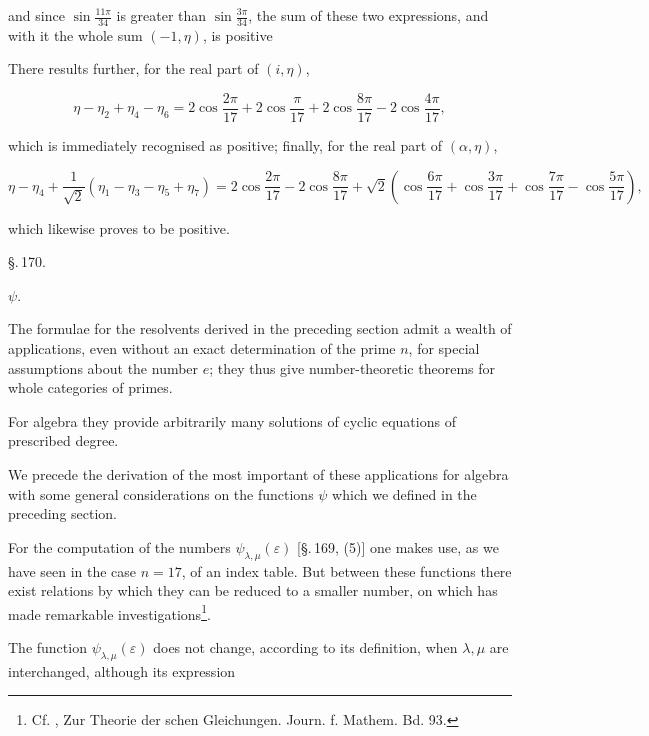 and since $\sin\frac{11\pi}{34}$ is greater than $\sin\frac{3\pi}{34}$, the sum of these
two expressions, and with it the whole sum $(-1,\eta)$, is positive %

There results further, for the real part of $(i,\eta)$,

\[
\eta - \eta_2 + \eta_4 - \eta_6 = 2\cos\frac{2\pi}{17} + 2\cos\frac{\pi}{17} + 2\cos\frac{8\pi}{17} - 2\cos\frac{4\pi}{17},
\]

which is immediately recognised as positive; finally, for the real
part of $(\alpha,\eta)$,

\[
\eta - \eta_4 + \frac{1}{\sqrt{2}}(\eta_1 - \eta_3 - \eta_5 + \eta_7)
= 2\cos\frac{2\pi}{17} - 2\cos\frac{8\pi}{17} + \sqrt{2}\left(\cos\frac{6\pi}{17} + \cos\frac{3\pi}{17} + \cos\frac{7\pi}{17} - \cos\frac{5\pi}{17}\right),
\]

which likewise proves to be positive.

\begin{center}
\S.\,170.

 $\psi$.
\end{center}

The formulae for the resolvents derived in the preceding
section admit a wealth of applications, even without an exact
determination of the prime $n$, for special assumptions
about the number $e$; they thus give number-theoretic theorems for
whole categories of primes.

For algebra they provide arbitrarily many solutions of cyclic
equations of prescribed degree.

We precede the derivation of the most important of these applications
for algebra with some general considerations on
the functions $\psi$ which we defined in the preceding
section.

For the computation of the numbers $\psi_{\lambda,\mu}(\varepsilon)$ [\S.\,169, (5)] one makes
use, as we have seen in the case $n = 17$, of an index table.
But between these functions there exist relations by
which they can be reduced to a smaller number, on which
 has made remarkable investigations\footnote{Cf. , Zur Theorie der schen Gleichungen. Journ. f. Mathem. Bd. 93.}.

The function $\psi_{\lambda,\mu}(\varepsilon)$ does not change, according to its definition,
when $\lambda,\mu$ are interchanged, although its expression
